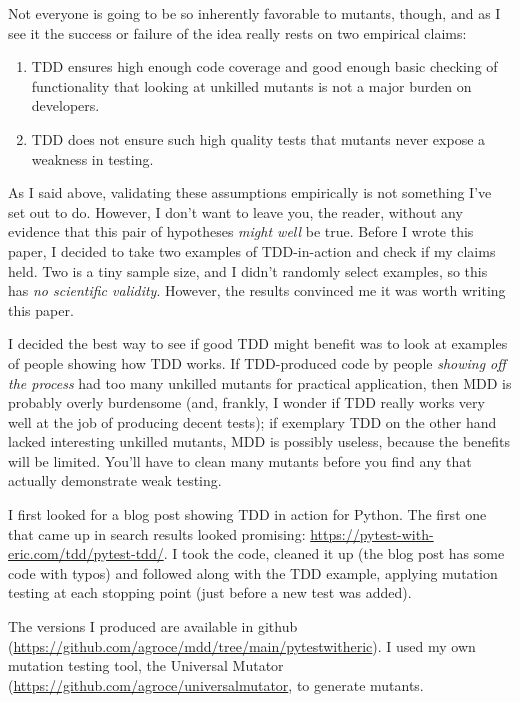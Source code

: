 \documentclass[sigplan,screen]{acmart}
\begin{document}
Not everyone is going to be so inherently favorable to mutants,
though, and as I see it the success or failure of the idea really
rests on two empirical claims:

\begin{enumerate}
  \item TDD ensures high enough code coverage and good enough basic
    checking of functionality that looking at unkilled mutants is not
    a major burden on developers.
    \item TDD does not ensure such high quality tests that mutants
      never expose a weakness in testing.
    \end{enumerate}

    As I said above, validating these assumptions empirically is not
    something I've set out to do.  However, I don't want to leave you,
    the reader, without any evidence that this pair of hypotheses
    \emph{might well} be true.  Before I wrote this paper, I decided
    to take two examples of TDD-in-action and check if my claims
    held.  Two is a tiny sample size, and I didn't randomly select
    examples, so this has \emph{no scientific validity}.  However, the
    results convinced me it was worth writing this paper.

    I decided the best way to see if good TDD might benefit was to
    look at examples of people showing how TDD works.  If TDD-produced
    code by people \emph{showing off the process} had too many
    unkilled mutants for practical application, then MDD is probably
    overly burdensome (and, frankly, I wonder if TDD really works very
    well at the job of producing decent tests); if exemplary TDD
    on the other hand lacked interesting unkilled mutants, MDD is
    possibly useless, because the benefits will be limited.  You'll
    have to clean many mutants before you find any that actually
    demonstrate weak testing.

    I first looked for a blog post showing TDD in action for Python.
    The first one that came up in search results looked promising:
    \url{https://pytest-with-eric.com/tdd/pytest-tdd/}.  I took the
    code, cleaned it up (the blog post has some code with typos) and
    followed along with the TDD example, applying mutation testing at
    each stopping point (just before a new test was added).

    The versions I produced are available in github
    (\url{https://github.com/agroce/mdd/tree/main/pytestwitheric}).  I
    used my own mutation testing tool, the Universal
    Mutator~\cite{SyntaxUM}
    (\url{https://github.com/agroce/universalmutator}, to generate
    mutants.
\end{document}
